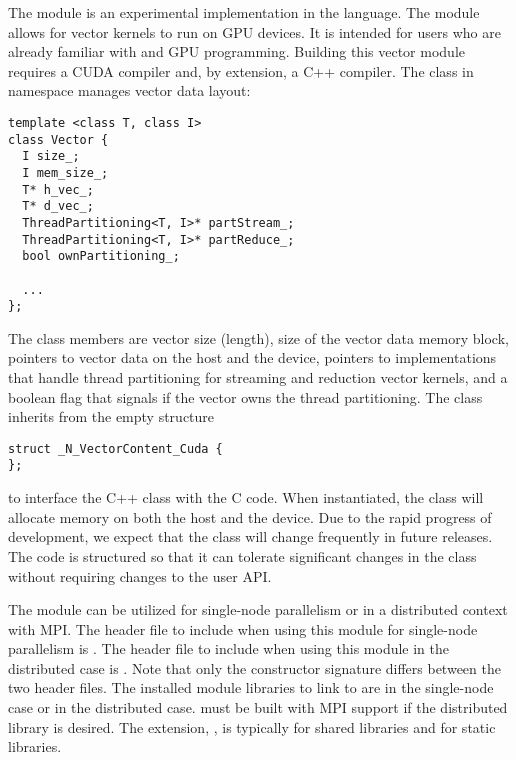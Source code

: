 %
The {\nveccuda} module is an experimental {\nvector} implementation in the {\cuda} language.
The module allows for {\sundials} vector kernels to run on GPU devices. It is intended for users
who are already familiar with {\cuda} and GPU programming. Building this vector
module requires a CUDA compiler and, by extension, a C++ compiler. The class 
in namespace  manages vector data layout:
\begin{verbatim}
template <class T, class I>
class Vector {
  I size_;
  I mem_size_;
  T* h_vec_;
  T* d_vec_;
  ThreadPartitioning<T, I>* partStream_;
  ThreadPartitioning<T, I>* partReduce_;
  bool ownPartitioning_;

  ...
};
\end{verbatim}

The class members are vector size (length), size of the vector data memory block, pointers
to vector data on the host and the device, pointers to 
implementations that handle thread partitioning for streaming and
reduction vector kernels, and a boolean flag that signals if the
vector owns the thread partitioning. The class  inherits from the empty structure
\begin{verbatim}
struct _N_VectorContent_Cuda {
};
\end{verbatim}
to interface the C++ class with the {\nvector} C code. When instantiated, the class
 will allocate memory on both the host and the device. Due to the rapid
progress of {\cuda} development, we expect that the 
class will change frequently in future {\sundials} releases. The code is
structured so that it can tolerate significant changes in the
 class without requiring changes to the user API.


The {\nveccuda} module can be utilized for single-node parallelism or in a distributed context with MPI.
The header file to include when using this module for single-node parallelism is .
The header file to include when using this module in the distributed case is .
Note that only the {\nveccuda} constructor signature differs between the two header files.
The installed module libraries to link to are  in the single-node case
or  in the distributed case. {\sundials} must be built with
MPI support if the distributed library is desired. The extension, , is typically  for shared libraries and  for static libraries.

